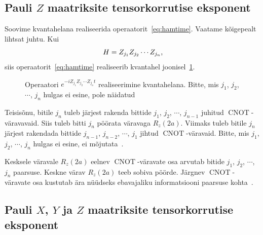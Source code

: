 \documentclass[12pt]{report}
\def\cnot{\mathop{\mathrm{CNOT}}\nolimits}
\begin{document}
\subsection{Pauli $Z$ maatriksite tensorkorrutise eksponent}

Soovime kvantahelana realiseerida operaatorit~\ref{eq:hamtime}.
Vaatame kõigepealt lihtsat juhtu.
Kui
\begin{equation}
  H=Z_{j_1}Z_{j_2}\cdots Z_{j_n}\rlap{,}
\end{equation}
siis operaatorit~\ref{eq:hamtime} realiseerib kvantahel joonisel~\ref{f:expz}.

\begin{figure}[h]
  \centering
  \caption{Operaatori \(e^{-iZ_{j_1}Z_{j_2}\cdots Z_{j_n}t}\) realiseerimine kvantahelana. Bitte, mis \(j_1\), \(j_2\), \(\cdots\), \(j_n\) hulgas ei esine, pole näidatud}
  \label{f:expz}
\end{figure}

Teisisõnu, bitile \(j_n\) tuleb järjest rakenda bittide \(j_1\), \(j_2\), \(\cdots\), \(j_{n-1}\) juhitud \(\cnot\)-väravavaid.
Siis tuleb bitti \(j_n\) pöörata väravaga \(R_z(2a)\).
Viimaks tuleb bitile \(j_n\) järjest rakendada bittide \(j_{n-1}\), \(j_{n-2}\), \(\cdots\), \(j_1\) jihtud \(\cnot\)-väravaid.
Bitte, mis \(j_1\), \(j_2\), \(\cdots\), \(j_n\) hulgas ei esine, ei mõjutata~\cite{mansky+etal}.

Kesksele väravale \(R_z(2a)\) eelnev \(\cnot\)-väravate osa arvutab bitide \(j_1\), \(j_2\), \(\cdots\), \(j_n\) paarsuse.
Keskne värav \(R_z(2a)\) teeb sobiva pöörde.
Järgnev \(\cnot\)-väravate osa kustutab ära nüüdseks ebavajaliku informatsiooni paarsuse kohta~\cite{nielsen+chuang}.


\subsection{Pauli $X$, $Y$ ja $Z$ maatriksite tensorkorrutise eksponent}
\end{document}
